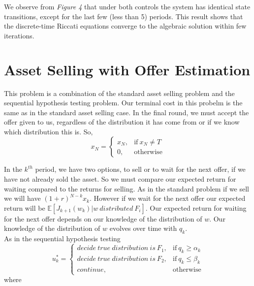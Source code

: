 \documentclass[11pt, oneside]{article}   	%
\begin{document}
We observe from \textit{Figure 4} that under both controls the system has identical state transitions, except for the last few (less than 5) periods. This result shows that the discrete-time Riccati equations converge to the algebraic solution within few iterations.

\section{Asset Selling with Of\mbox{}fer Estimation}
This problem is a combination of the standard asset selling problem and the sequential hypothesis testing problem. Our terminal cost in this probelm is the same as in the standard asset selling case. In the final round, we must accept the offer given to us, regardless of the distribution it has come from or if we know which distribution this is. So,
 \begin{equation}
    x_{N}=
    \begin{cases}
      x_{N}, & \text{if}\ x_{N}\neq T \\
      0, & \text{otherwise}
    \end{cases}
  \end{equation}

In the $k^{th}$ period, we have two options, to sell or to wait for the next offer, if we have not already sold the asset. So we must compare our expected return for waiting compared to the returns for selling. As in the standard problem if we sell we will have $(1+r)^{N-k}x_{k}$. However if we wait for the next offer our expected return will be $\mathbb{E}[J_{k+1}(w_{k})| w~distributed~ F_{i}]$. Our expected return for waiting for the next offer depends on our knowledge of the distribution of $w$. Our knowledge of the distribution of $w$ evolves over time with $q_{k}$. \\
As in the sequential hypothesis testing
 \begin{equation}
    u^{*}_{k}=
    \begin{cases}
      decide~true~ distribution ~is~ F_{1}, & \text{if}\ q_{k} \geq \alpha_{k} \\
      decide ~true~ distribution~ is~ F_{2}, & \text{if}\ q_{k} \leq \beta_{k} \\
      continue, & \text{otherwise}
    \end{cases}
  \end{equation}
where
\end{document}
